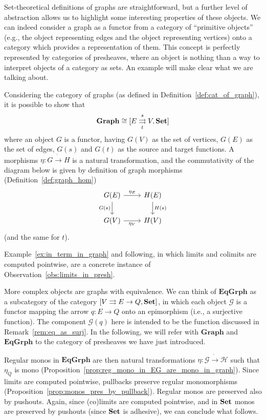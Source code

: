 \documentclass[a4paper, twoside,openright]{report}
\theoremstyle{plain}
\theoremstyle{definition}
\begin{document}
Set-theoretical definitions of graphs are straightforward, but a further level of abstraction allows us to highlight some interesting properties of these objects. We can indeed consider a graph as a functor from a category of ``primitive objects'' (e.g., the object representing edges and the object representing vertices) onto a category which provides a representation of them. This concept is perfectly represented by categories of presheaves, where an object is nothing than a way to interpret objects of a category as sets. An example will make clear what we are talking about.

Considering the category of graphs (as defined in Definition~\ref{def:cat_of_graph}), it is possible to show that 
$$\mathbf{Graph} \cong [E \mathrel{\mathop{\rightrightarrows}^{s}_{t}} V , \mathbf{Set}]$$
where an object $G$ is a functor, having $G(V)$ as the set of vertices, $G(E)$ as the set of edges, $G(s)$ and $G(t)$ as the source and target functions. A morphisms $\eta: G \dot\rightarrow H$ is a natural transformation, and the commutativity of the diagram below is given by definition of graph morphisms (Definition~\ref{def:graph_hom})
$$
    \begin{tikzcd}
        G(E) \arrow[r, "{\eta_E}"] \arrow[d, "G(s)"swap] & H(E) \arrow[d, "H(s)"] \\
        G(V) \arrow[r, "{\eta_V}"swap] & H(V)
    \end{tikzcd}
$$
(and the same for $t$).

Example~\ref{ex:in_term_in_graph} and following, in which limits and colimits are computed pointwise, are a concrete instance of Observation~\ref{obs:limits_in_presh}.

More complex objects are graphs with equivalence. We can think of $\mathbf{EqGrph}$ as a subcategory of the category $[V \rightrightarrows E \rightarrow Q, \mathbf{Set}]$, in which each object $\mathcal{G}$ is a functor mapping the arrow $q: E \rightarrow Q$ onto an epimorphism (i.e., a surjective function). The component $\mathcal{G}(q)$ here is intended to be the function discussed in Remark~\ref{rem:eq_as_surj}. 
In the following, we will refer with $\mathbf{Graph}$ and $\mathbf{EqGrph}$ to the category of presheaves we have just introduced.

Regular monos in $\mathbf{EqGrph}$ are then natural transformations $\eta: \mathcal{G \dot\rightarrow H}$ such that $\eta_Q$ is mono (Proposition~\ref{prop:reg_mono_in_EG_are_mono_in_graph}). Since limits are computed pointwise, pullbacks preserve regular monomorphisms (Proposition~\ref{prop:monos_pres_by_pullback}). Regular monos are preserved also by pushouts. Again, since (co)limits are computed pointwise, and in $\mathbf{Set}$ monos are preserved by pushouts (since $\mathbf{Set}$ is adhesive), we can conclude what follows.
\end{document}
